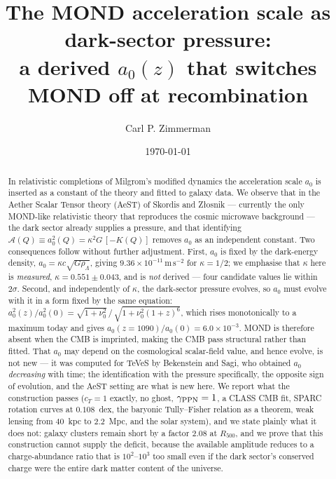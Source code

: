 \documentclass[aps,prd,twocolumn,superscriptaddress,nofootinbib,floatfix]{revtex4-2}
\newcommand{\azero}{a_{0}}
\newcommand{\Acal}{\mathcal{A}}
\begin{document}
\title{The MOND acceleration scale as dark-sector pressure:\\
a derived $\azero(z)$ that switches MOND off at recombination}

\author{Carl P. Zimmerman}
\email{}

\date{\today}

\begin{abstract}
In relativistic completions of Milgrom's modified dynamics the acceleration scale $\azero$ is
inserted as a constant of the theory and fitted to galaxy data. We observe that in the Aether
Scalar Tensor theory (AeST) of Skordis and Z\l osnik --- currently the only MOND-like
relativistic theory that reproduces the cosmic microwave background --- the dark sector already
supplies a pressure, and that identifying
$\Acal(Q) \equiv \azero^{2}(Q) = \kappa^{2} G\,[-K(Q)]$
removes $\azero$ as an independent constant. Two consequences follow without further
adjustment. First, $\azero$ is fixed by the dark-energy density, $\azero = \kappa c \sqrt{G
\rho_{\Lambda}}$, giving $9.36\times10^{-11}\,\mathrm{m\,s^{-2}}$ for $\kappa = 1/2$; we
emphasise that $\kappa$ here is \emph{measured}, $\kappa = 0.551 \pm 0.043$, and is
\emph{not} derived --- four candidate values lie within $2\sigma$. Second, and independently of
$\kappa$, the dark-sector pressure evolves, so $\azero$ must evolve with it in a form fixed by
the same equation: $\azero^{2}(z)/\azero^{2}(0) = \sqrt{1+\nu_{0}^{2}}\,/\,\sqrt{1 +
\nu_{0}^{2}(1+z)^{6}}$, which rises monotonically to a maximum today and gives
$\azero(z{=}1090)/\azero(0) = 6.0\times10^{-3}$. MOND is therefore absent when the CMB is
imprinted, making the CMB pass structural rather than fitted. That $\azero$ may depend on the
cosmological scalar-field value, and hence evolve, is not new --- it was computed for TeVeS by
Bekenstein and Sagi, who obtained $\azero$ \emph{decreasing} with time; the identification with
the pressure specifically, the opposite sign of evolution, and the AeST setting are what is
new here. We report what the construction passes ($c_{T}=1$ exactly, no ghost, $\gamma_{\rm
PPN}=1$, a CLASS CMB fit, SPARC rotation curves at $0.108$~dex, the baryonic Tully--Fisher
relation as a theorem, weak lensing from $40$~kpc to $2.2$~Mpc, and the solar system), and we
state plainly what it does not: galaxy clusters remain short by a factor $2.08$ at $R_{500}$,
and we prove that this construction cannot supply the deficit, because the available amplitude
reduces to a charge-abundance ratio that is $10^{2}$--$10^{3}$ too small even if the dark
sector's conserved charge were the entire dark matter content of the universe.
\end{abstract}
\end{document}
